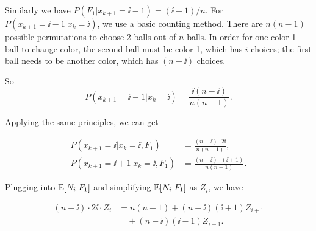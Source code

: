 \begin{solution}
Similarly we have $P(F_1\vert x_{k+1}=\ii-1)=(\ii-1)/n$. For $P(x_{k+1}=\ii-1\vert x_k=\ii)$, we use a
basic counting method. There are $n(n-1)$ possible permutations to choose 2 balls out of $n$ balls. In
order for one color 1 ball to change color, the second ball must be color 1, which has $i$ choices; the
first ball needs to be another color, which has $(n-\ii)$ choices.

So
\[
P(x_{k+1}=\ii-1\vert x_k=\ii)=\frac{\ii(n-\ii)}{n(n-1)}.
\]

Applying the same principles, we can get

\[
\begin{aligned}
P(x_{k+1}=\ii\vert x_k=\ii,F_1)&=\frac{(n-\ii)\cdot 2\ii}{n(n-1)},\\
P(x_{k+1}=\ii+1\vert x_k=\ii,F_1)&=\frac{(n-\ii)\cdot(\ii+1)}{n(n-1)}.
\end{aligned}
\]

Plugging into $\mathbb{E}[N_i\vert F_1]$ and simplifying $\mathbb{E}[N_i\vert F_1]$ as $Z_i$, we have

\[
\begin{aligned}
(n-\ii)\cdot 2\ii\cdot Z_i
&=n(n-1)+(n-\ii)(\ii+1)Z_{i+1}\\
&\quad+(n-\ii)(\ii-1)Z_{i-1}.
\end{aligned}
\]
\end{solution}
